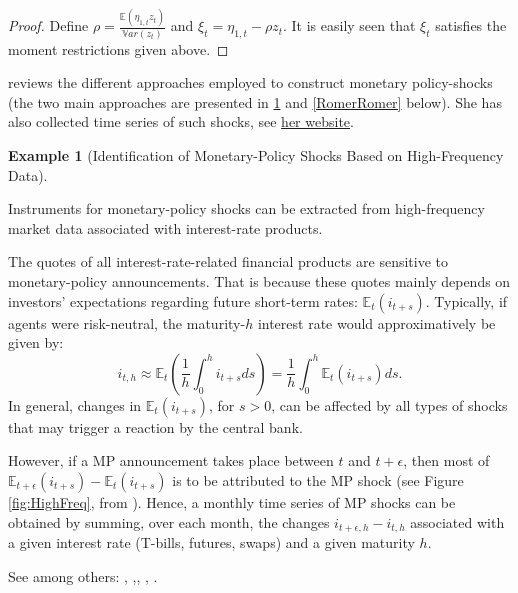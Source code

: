 \documentclass[
]{book}
\theoremstyle{definition}
\theoremstyle{definition}
\newtheorem{example}{Example}[chapter]
\theoremstyle{definition}
\theoremstyle{definition}
\theoremstyle{remark}
\begin{document}
\begin{proof}
Define \(\rho = \frac{\mathbb{E}(\eta_{1,t}z_t)}{\mathbb{V}ar(z_t)}\) and \(\xi_t = \eta_{1,t} - \rho z_t\). It is easily seen that \(\xi_t\) satisfies the moment restrictions given above.
\end{proof}

\citet{Ramey_2016_NBER} reviews the different approaches employed to construct monetary policy-shocks (the two main approaches are presented in \ref{exm:HighFreq} and \ref{RomerRomer} below). She has also collected time series of such shocks, see \href{https://econweb.ucsd.edu/~vramey/research.html\#mon}{her website}.

\begin{example}[Identification of Monetary-Policy Shocks Based on High-Frequency Data]
\protect\hypertarget{exm:HighFreq}{}\label{exm:HighFreq}

Instruments for monetary-policy shocks can be extracted from high-frequency market data associated with interest-rate products.

The quotes of all interest-rate-related financial products are sensitive to monetary-policy announcements. That is because these quotes mainly depends on investors' expectations regarding future short-term rates: \(\mathbb{E}_t(i_{t+s})\). Typically, if agents were risk-neutral, the maturity-\(h\) interest rate would approximatively be given by:
\[
i_{t,h} \approx \mathbb{E}_t\left(\frac{1}{h}\int_{0}^{h} i_{t+s} ds\right) = \frac{1}{h}\int_{0}^{h} \mathbb{E}_t\left(i_{t+s}\right) ds.
\]
In general, changes in \(\mathbb{E}_t(i_{t+s})\), for \(s>0\), can be affected by all types of shocks that may trigger a reaction by the central bank.

However, if a MP announcement takes place between \(t\) and \(t+\epsilon\), then most of \(\mathbb{E}_{t+\epsilon}(i_{t+s})-\mathbb{E}_t(i_{t+s})\) is to be attributed to the MP shock (see Figure \ref{fig:HighFreq}, from \citet{Gurkaynak_et_al_2005}). Hence, a monthly time series of MP shocks can be obtained by summing, over each month, the changes \(i_{t+ \epsilon,h} - i_{t,h}\) associated with a given interest rate (T-bills, futures, swaps) and a given maturity \(h\).

See among others: \citet{KUTTNER2001523}, \citet{Cochrane_Piazzesi_2002},\citet{Gurkaynak_et_al_2005}, \citet{Piazzesi_Swanson_2008}, \citet{Gertler_Karadi_2015}.


\end{example}
\end{document}
